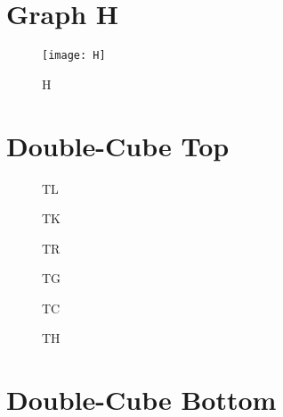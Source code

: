 \documentclass[a4paper,10pt]{article}
\begin{document}
\section{Graph H}

\begin{figure}[h!]
  \centering
    \texttt{[image: H]}
  \caption{H}
\end{figure}


\begin{landscape}

\section{Double-Cube Top}
\begin{figure}[ht]
\begin{minipage}[b]{0.33\linewidth}
\centering
   \fbox{\texttt{[image: TL]}}
\caption{TL}
\label{fig:figure1}
\end{minipage}
\hspace{0.5cm}
\begin{minipage}[b]{0.33\linewidth}
\centering
   \fbox{\texttt{[image: TK]}}
\caption{TK}
\label{fig:figure2}
\end{minipage}
\begin{minipage}[b]{0.33\linewidth}
\centering
   \fbox{\texttt{[image: TR]}}
\caption{TR}
\label{fig:figure1}
\end{minipage}
\begin{minipage}[b]{0.33\linewidth}
\centering
   \fbox{\texttt{[image: TG]}}
\caption{TG}
\label{fig:figure1}
\end{minipage}
\hspace{0.5cm}
\begin{minipage}[b]{0.33\linewidth}
\centering
   \fbox{\texttt{[image: TC]}}
\caption{TC}
\label{fig:figure2}
\end{minipage}
\begin{minipage}[b]{0.33\linewidth}
\centering
   \fbox{\texttt{[image: TH]}}
\caption{TH}
\label{fig:figure1}
\end{minipage}
\end{figure}


\section{Double-Cube Bottom}


\end{landscape}
\end{document}
